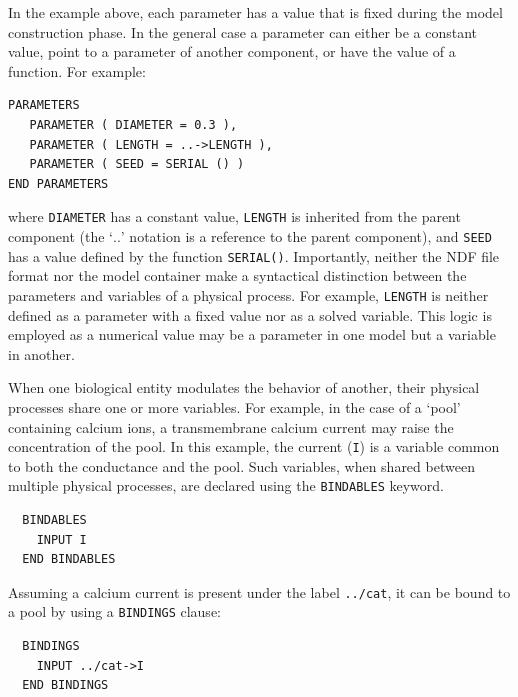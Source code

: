\documentclass[11pt,3p,twocolumn]{JMN}
\begin{document}
In the example above, each parameter has a value that is fixed during the model construction phase.  In the general case a parameter can either be a constant value, point to a parameter of another component, or have the value of a function.  For example:

\begin{tiny}
\begin{verbatim}
PARAMETERS
   PARAMETER ( DIAMETER = 0.3 ),
   PARAMETER ( LENGTH = ..->LENGTH ),
   PARAMETER ( SEED = SERIAL () )
END PARAMETERS
\end{verbatim}
\end{tiny}

where {\tt DIAMETER} has a constant value, {\tt LENGTH} is inherited from the parent component (the `$..$' notation is a reference to the parent component), and {\tt SEED} has a value defined by the function {\tt SERIAL()}.  Importantly, neither the NDF file format nor the model container make a syntactical distinction between the parameters and variables of a physical process.  For example, {\tt LENGTH} is neither defined as a parameter with a fixed value nor as a solved variable.  This logic is employed as a numerical value may be a parameter in one model but a variable in another.

When one biological entity modulates the behavior of another, their physical processes share one or more variables.  For example, in the case of a `pool' containing calcium ions, a transmembrane calcium current may raise the concentration of the pool. In this example, the current ({\tt I}) is a variable common to both the conductance and the pool. Such variables, when shared between multiple physical processes, are declared using the {\tt BINDABLES} keyword.

\begin{tiny}
\begin{verbatim}
  BINDABLES
    INPUT I
  END BINDABLES
\end{verbatim}
\end{tiny}
Assuming a calcium current is present under the label {\tt ../cat}, it can be bound to a pool by using a {\tt BINDINGS} clause:
\begin{tiny}
\begin{verbatim}
  BINDINGS
    INPUT ../cat->I
  END BINDINGS
\end{verbatim}
\end{tiny}
\end{document}
